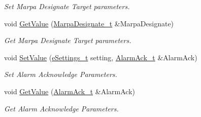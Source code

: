 \begin{DoxyCompactItemize}
\begin{DoxyCompactList}\small\item\em Set Marpa Designate Target parameters. \end{DoxyCompactList}\item 
void \mbox{\hyperlink{struct_quantum_lib_1_1_setting_data__t_aba02eca98fe521b09aab9d64de121bd0}{Get\+Value}} (\mbox{\hyperlink{struct_quantum_lib_1_1_marpa_designate__t}{Marpa\+Designate\+\_\+t}} \&Marpa\+Designate)
\begin{DoxyCompactList}\small\item\em Get Marpa Designate Target parameters. \end{DoxyCompactList}\item 
void \mbox{\hyperlink{struct_quantum_lib_1_1_setting_data__t_a5b3f0fe0ea0bc8b0382615ba53deb659}{Set\+Value}} (\mbox{\hyperlink{namespace_quantum_lib_acc8124e3e65bca4aa798d03a55e3d54c}{e\+Settings\+\_\+t}} setting, \mbox{\hyperlink{struct_quantum_lib_1_1_alarm_ack__t}{Alarm\+Ack\+\_\+t}} \&Alarm\+Ack)
\begin{DoxyCompactList}\small\item\em Set Alarm Acknowledge Parameters. \end{DoxyCompactList}\item 
void \mbox{\hyperlink{struct_quantum_lib_1_1_setting_data__t_a265ae2d7fc8ed10b8786e1df49d9a1ab}{Get\+Value}} (\mbox{\hyperlink{struct_quantum_lib_1_1_alarm_ack__t}{Alarm\+Ack\+\_\+t}} \&Alarm\+Ack)
\begin{DoxyCompactList}\small\item\em Get Alarm Acknowledge Parameters. \end{DoxyCompactList}\end{DoxyCompactItemize}


